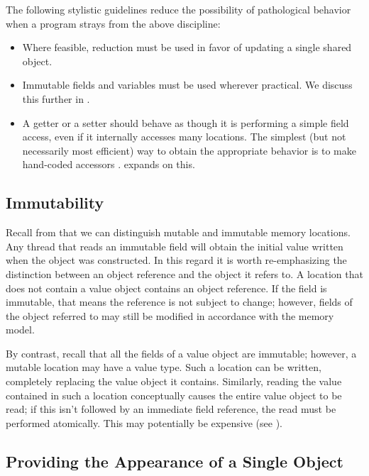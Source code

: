 The following stylistic guidelines reduce the possibility of
pathological behavior when a program strays from the above discipline:
\begin{itemize}

\item Where feasible, reduction must be used in favor of updating a
  single shared object.

\item Immutable fields and variables must be used wherever
  practical.  We discuss this further in .

\item A getter or a setter should behave as though it is performing a
  simple field access, even if it internally accesses many
  locations.  The simplest (but not necessarily most
  efficient) way to obtain the appropriate behavior is to make
  hand-coded accessors .   expands on
  this.

\end{itemize}

\subsection{Immutability}

Recall from  that we can distinguish mutable and
immutable memory locations.  Any thread that reads an immutable field
will obtain the initial value written when the object was constructed.
In this regard it is worth re-emphasizing the distinction between an
object reference and the object it refers to.  A location that does not
contain a value object contains an object reference.  If the field is
immutable, that means the reference is not subject to change; however,
fields of the object referred to may still be modified in accordance with the
memory model.

By contrast, recall that all the fields of a value object are
immutable; however, a mutable location may have a value type.  Such a
location can be written, completely replacing the value object it
contains.  Similarly, reading the value contained in such a location
conceptually causes the entire value object to be read; if this isn't
followed by an immediate field reference, the read must be performed
atomically.  This may potentially be expensive (see
).

\subsection{Providing the Appearance of a Single Object}

